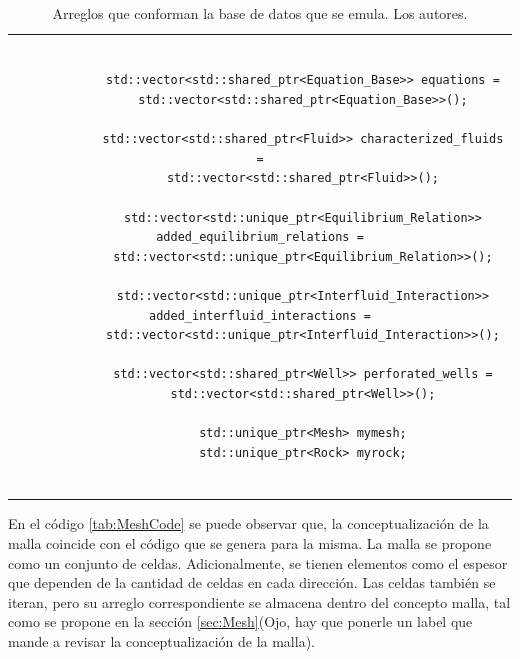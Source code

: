 \begin{table}
	\begin{tabular}{c}
		\begin{tiny}
			\begin{lstlisting}
			
			std::vector<std::shared_ptr<Equation_Base>> equations =
			std::vector<std::shared_ptr<Equation_Base>>();
			
			std::vector<std::shared_ptr<Fluid>> characterized_fluids =
			std::vector<std::shared_ptr<Fluid>>();
			
			std::vector<std::unique_ptr<Equilibrium_Relation>> added_equilibrium_relations =
			std::vector<std::unique_ptr<Equilibrium_Relation>>();
			
			std::vector<std::unique_ptr<Interfluid_Interaction>> added_interfluid_interactions =
			std::vector<std::unique_ptr<Interfluid_Interaction>>();
			
			std::vector<std::shared_ptr<Well>> perforated_wells =
			std::vector<std::shared_ptr<Well>>();
			
			std::unique_ptr<Mesh> mymesh;
			std::unique_ptr<Rock> myrock;
			
			\end{lstlisting}
		\end{tiny}
	\end{tabular}
	\label{tab:bd}
	\caption[Arreglos que conforman la base de datos que se emula.]{Arreglos que conforman la base de datos que se emula. Los autores.}
\end{table}

En el código \ref{tab:MeshCode} se puede observar que, la conceptualización de la malla coincide con el código que se genera para la misma. La malla se propone como un conjunto de celdas. Adicionalmente, se tienen elementos como el espesor que dependen de la cantidad de celdas en cada dirección. Las celdas también se iteran, pero su arreglo correspondiente se almacena dentro del concepto malla, tal como se propone en la sección \ref{sec:Mesh}(Ojo, hay que ponerle un label que mande a revisar la conceptualización de la malla).

